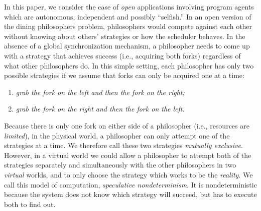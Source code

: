 In this paper, we consider the case of {\em open} applications 
involving program agents which are autonomous, independent and 
possibly ``selfish.'' In an open version of
the dining philosophers problem, philosophers would compete against 
each other without knowing about others' strategies or how
the scheduler behaves. 
In the absence of a global synchronization mechanism, 
a philosopher needs to
come up with a strategy that achieves success (i.e., acquiring both forks)
regardless of what other philosophers do.
In this simple setting, each philosopher has only two possible strategies if we
assume that forks can only be acquired one at a time:
\begin{enumerate}
\item {\em grab the fork on the left and then the fork on the right;}
\item {\em grab the fork on the right and then the fork on the left.}
\end{enumerate}

Because there is only one fork on either side of a philosopher (i.e., 
resources are {\em limited}), in the physical world, a philosopher can only
attempt one of the strategies at a time. We therefore call these
two strategies {\em mutually exclusive}.
However, in a virtual world we could allow a philosopher 
to attempt both of the strategies separately and simultaneously with 
the other philosophers in two {\em virtual} worlds,
and to only choose the strategy which works to be the {\em reality}.
We call this model of computation, {\em speculative nondeterminism}. 
It is nondeterministic because the system
does not know which strategy will succeed, but has to
execute both to find out.

